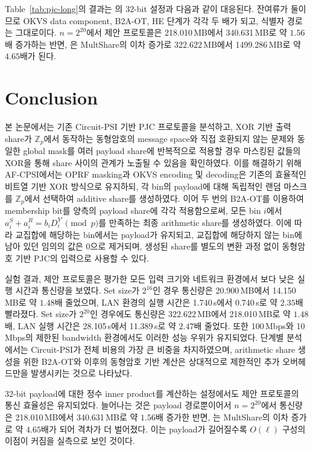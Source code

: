 \documentclass[sigconf,anonymous,review]{acmart}
\begin{document}
Table~\ref{tab:pjc-long}의 결과는 의 32-bit 설정과
다음과 같이 대응된다. 잔여류가 둘이므로 OKVS data component, B2A-OT, HE 단계가
각각 두 배가 되고, 식별자 경로는 그대로이다. $n=2^{20}$에서 제안 프로토콜은
218.010\,MB에서 340.631\,MB로 약 $1.56$배 증가하는 반면, \cite{KLS26}은
MultShare의 이차 증가로 322.622\,MB에서 1499.286\,MB로 약 $4.65$배가 된다.


\section{Conclusion}\label{sec:conclusion}


본 논문에서는 기존 Circuit-PSI 기반 PJC 프로토콜을 분석하고, XOR 기반 출력 share가 \(\mathbb{Z}_p\)에서 동작하는 동형암호의 message space와 직접 호환되지 않는 문제와 
동일한 global mask를 여러 payload share에 반복적으로 적용할 경우
마스킹된 값들의 XOR을 통해 share 사이의 관계가 노출될 수 있음을
확인하였다. 이를 해결하기 위해 AF-CPSI에서는 OPRF masking과 OKVS encoding 및 decoding은 기존의 효율적인 비트열 기반 XOR 방식으로 유지하되, 각 bin의 payload에 대해 독립적인 랜덤 마스크를 \(\mathbb{Z}_p\)에서 선택하여 additive share를 생성하였다. 이어 두 번의 B2A-OT를 이용하여 membership bit를 양측의 payload share에 각각 적용함으로써, 모든 bin \(i\)에서 \(a_i^S+a_i^R=b_iD_i^{Y'}\pmod p\)를 만족하는 최종 arithmetic share를 생성하였다. 이에 따라 교집합에 해당하는 bin에서는 payload가 유지되고, 교집합에 해당하지 않는 bin에 남아 있던 임의의 값은 \(0\)으로 제거되며, 생성된 share를 별도의 변환 과정 없이 동형암호 기반 PJC의 입력으로 사용할 수 있다. 

실험 결과, 제안 프로토콜은 평가한 모든 입력 크기와 네트워크
환경에서 \cite{KLS26}보다 낮은 실행 시간과 통신량을 보였다.
Set size가 \(2^{16}\)인 경우 통신량은
20.900\,MB에서 14.150\,MB로 약 $1.48$배 줄었으며, LAN
환경의 실행 시간은 1.740\,s에서 0.740\,s로 약 $2.35$배
빨라졌다. Set size가 \(2^{20}\)인 경우에도 통신량은
322.622\,MB에서 218.010\,MB로 약 $1.48$배, LAN 실행 시간은
28.105\,s에서 11.389\,s로 약 $2.47$배 줄었다. 또한
100\,Mbps와 10\,Mbps의 제한된 bandwidth 환경에서도 이러한
성능 우위가 유지되었다. 단계별 분석에서는 Circuit-PSI가 전체
비용의 가장 큰 비중을 차지하였으며, arithmetic share 생성을 위한
B2A-OT와 이후의 동형암호 기반 계산은 상대적으로 제한적인
추가 오버헤드만을 발생시키는 것으로 나타났다.

32-bit payload에 대한 정수 inner product를 계산하는
설정에서도 제안 프로토콜의 통신 효율성은 유지되었다. 늘어나는 것은 payload
경로뿐이어서 $n=2^{20}$에서 통신량은 218.010\,MB에서
340.631\,MB로 약 $1.56$배 증가한 반면, \cite{KLS26}는 MultShare의 이차 증가로
약 $4.65$배가 되어 격차가 더 벌어졌다. 이는 payload가 길어질수록 $O(\ell)$
구성의 이점이 커짐을 실측으로 보인 것이다.
\end{document}
